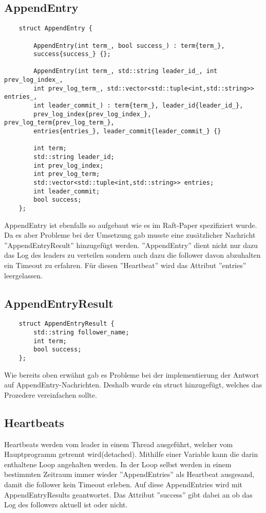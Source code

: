 \subsection{AppendEntry}
\begin{verbatim}
    struct AppendEntry {
        
        AppendEntry(int term_, bool success_) : term{term_},
        success{success_} {};

        AppendEntry(int term_, std::string leader_id_, int prev_log_index_,
        int prev_log_term_, std::vector<std::tuple<int,std::string>> entries_,
        int leader_commit_) : term{term_}, leader_id{leader_id_},
        prev_log_index{prev_log_index_}, prev_log_term{prev_log_term_},
        entries{entries_}, leader_commit{leader_commit_} {}
        
        int term;
        std::string leader_id;
        int prev_log_index;
        int prev_log_term;
        std::vector<std::tuple<int,std::string>> entries;
        int leader_commit;
        bool success;
    };
\end{verbatim}
AppendEntry ist ebenfalls so aufgebaut wie es im Raft-Paper spezifiziert wurde. Da es aber Probleme bei der
Umsetzung gab musste eine zusätzlicher Nachricht ''AppendEntryResult'' hinzugefügt werden. ''AppendEntry'' dient nicht
nur dazu das Log des leaders zu verteilen sondern auch dazu die follower davon abzuhalten ein Timeout zu erfahren.
Für diesen ''Heartbeat'' wird das Attribut ''entries'' leergelassen.

\subsection{AppendEntryResult}
\begin{verbatim}
    struct AppendEntryResult {
        std::string follower_name;
        int term;
        bool success;
    };
\end{verbatim}
Wie bereits oben erwähnt gab es Probleme bei der implementierung der Antwort auf AppendEntry-Nachrichten. Deshalb wurde ein
struct hinzugefügt, welches das Prozedere vereinfachen sollte.

\subsection{Heartbeats}
Heartbeats werden vom leader in einem Thread ausgeführt, welcher vom Hauptprogramm getrennt wird(detached). Mithilfe einer
Variable kann die darin enthaltene Loop angehalten werden. In der Loop selbst werden in einem bestimmten Zeitraum immer wieder
''AppendEntries'' als Heartbeat ausgesand, damit die follower kein Timeout erleben.
\newline
Auf diese AppendEntries wird mit AppendEntryResults geantwortet. Das Attribut ''success'' gibt dabei an ob das Log des followers aktuell ist oder nicht.

